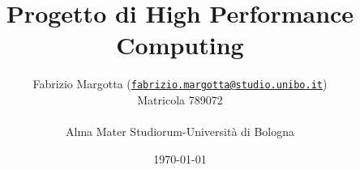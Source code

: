 \documentclass[a4paper]{article}
\begin{document}
\title{Progetto di High Performance Computing}
\author{Fabrizio Margotta
    (\href{mailto:fabrizio.margotta@studio.unibo.it}{\texttt{fabrizio.margotta@studio.unibo.it}})\\
    Matricola 789072\\
    \\
  Alma Mater Studiorum-Università di Bologna\\}
\date{\today}

\maketitle \thispagestyle{empty}

%
\pagestyle{headings}


%



%


%
\end{document}
